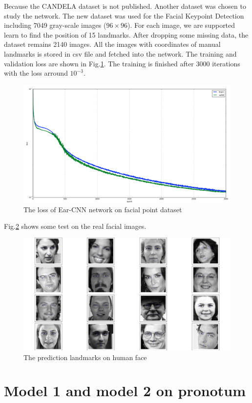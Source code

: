 Because the CANDELA dataset is not published. Another dataset was chosen to study the network. The new dataset was used for the Facial Keypoint Detection including 7049 gray-scale images ($96 \times 96$). For each image, we are supported learn to find the position of 15 landmarks. After dropping some missing data, the dataset remains 2140 images. All the images with coordinates of manual landmarks is stored in csv file and fetched into the network. The training and validation loss are shown in Fig.\ref{earLosstrain}. The training is finished after 3000 iterations with the loss arround $10^{-3}$.
\begin{figure}[h!]
	\centering
	\includegraphics[scale=0.27]{images/trainloss}
	\caption{The loss of Ear-CNN network on facial point dataset}
	\label{earLosstrain}
\end{figure}
Fig.\ref{earTest} shows some test on the real facial images.
\begin{figure}[h!]
	\centering
	\includegraphics[scale=0.27]{images/figure_1-1.png}
	\caption{The prediction landmarks on human face}
	\label{earTest}
\end{figure}
\section{Model 1 and model 2 on pronotum}
